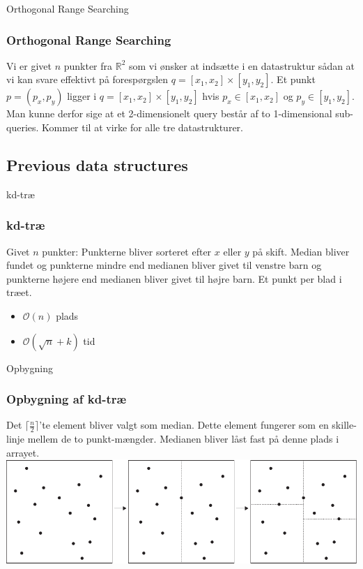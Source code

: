 \documentclass[pdf]{beamer}
\begin{document}
\begin{frame}{Orthogonal Range Searching}
  \frametitle{Orthogonal Range Searching}

  Vi er givet $n$ punkter fra $\mathbb{R}^2$ som vi ønsker at indsætte i en datastruktur sådan at vi kan svare effektivt på forespørgslen $q = [x_1, x_2] \times [y_1, y_2]$.
  Et punkt $p = (p_x, p_y)$ ligger i $q = [x_1, x_2] \times [y_1, y_2]$ hvis $p_x \in [x_1, x_2]$ og $p_y \in [y_1, y_2]$. Man kunne derfor sige at et 2-dimensionelt query består af to 1-dimensional sub-queries. Kommer til at virke for alle tre datastrukturer.
\end{frame}

\subsection{Previous data structures}

\begin{frame}{kd-træ}
  \frametitle{kd-træ}

  Givet $n$ punkter: Punkterne bliver sorteret efter $x$ eller $y$ på skift. Median bliver fundet og punkterne mindre end medianen bliver givet til venstre barn og punkterne højere end medianen bliver givet til højre barn. Et punkt per blad i træet.
  \begin{itemize}
    \item $\mathcal{O}(n)$ plads
    \item $\mathcal{O}(\sqrt{n} + k)$ tid
  \end{itemize}
\end{frame}

\begin{frame}{Opbygning}
  \frametitle{Opbygning af kd-træ}
  Det $\lceil \frac{n}{2} \rceil$'te element bliver valgt som median. Dette element fungerer som en skille-linje mellem de to punkt-mængder. Medianen bliver låst fast på denne plads i arrayet.
  \includegraphics[scale=0.75]{pictures/kd_subdivision-eps-converted-to.pdf}
\end{frame}
\end{document}
